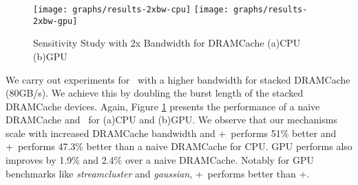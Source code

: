 \begin{figure}[!htb]
	\centering
	\texttt{[image: graphs/results-2xbw-cpu]}
	\texttt{[image: graphs/results-2xbw-gpu]}
	\caption{Sensitivity Study with 2x Bandwidth for DRAMCache (a)CPU (b)GPU}
	\label{results-ddr3-2133}
\end{figure}

We carry out experiments for \cachename\ with a higher bandwidth for stacked DRAMCache (80GB/s). We achieve this by doubling the burst length of the stacked DRAMCache devices. Again, Figure \ref{results-ddr3-2133}  presents the performance of a naive DRAMCache and \cachename\ for (a)CPU and (b)GPU. We observe that our mechanisms scale with increased DRAMCache bandwidth and \bypassname+\prioname\ performs 51\% better and \chaining+\prioname\ performs 47.3\% better than a naive DRAMCache for CPU. GPU performs also improves by 1.9\% and 2.4\% over a naive DRAMCache. Notably for GPU benchmarks like \textit{streamcluster} and \textit{gaussian}, \chaining+\prioname\ performs better than \bypassname+\prioname.

